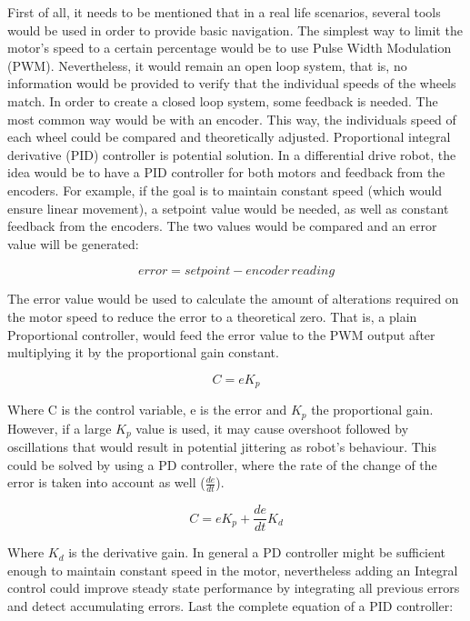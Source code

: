 First of all, it needs to be mentioned that in a real life scenarios, several tools would be used in order to provide basic navigation. The simplest way to limit the motor's speed to a certain percentage would be to use Pulse Width Modulation (PWM). Nevertheless, it would remain an open loop system, that is, no information would be provided to verify that the individual speeds of  the wheels match. In order to create a closed loop system, some feedback is needed. The most common way would be with an encoder. This way, the individuals speed of each wheel could be compared and theoretically adjusted. 
Proportional integral derivative (PID) controller is potential solution. In a differential drive robot, the idea would be to have a PID controller for both motors and feedback from the encoders. For example, if the goal is to maintain constant speed (which would ensure linear movement), a setpoint value would be needed, as well as constant feedback from the encoders. The two values would be compared and an error value will be generated:\cite{PID}

\begin{equation}
error = setpoint - encoder\,reading
\end{equation}

The error value would be used to calculate the amount of alterations required on the motor speed to reduce the error to a theoretical zero. That is, a plain Proportional controller, would feed the error value to the PWM output after multiplying it by the proportional gain constant. 

\begin{equation}
C = eK_p 
\end{equation}

Where C is the control variable, e is the error and $K_p$ the proportional gain. 
However, if a large $K_p$ value is used, it may cause overshoot followed by oscillations that would result in potential jittering as robot's behaviour. This could be solved by using a PD controller, where the rate of the change of the error is taken into account as well ($\frac{de}{dt}$). 

\begin{equation}
C = eK_p + \frac{de}{dt}K_d
\end{equation}

Where $K_d$ is the derivative gain. 
In general a PD controller might be sufficient enough to maintain constant speed in the motor, nevertheless adding an Integral control could improve steady state performance by integrating all previous errors and detect accumulating errors. Last the complete equation of a PID controller:


